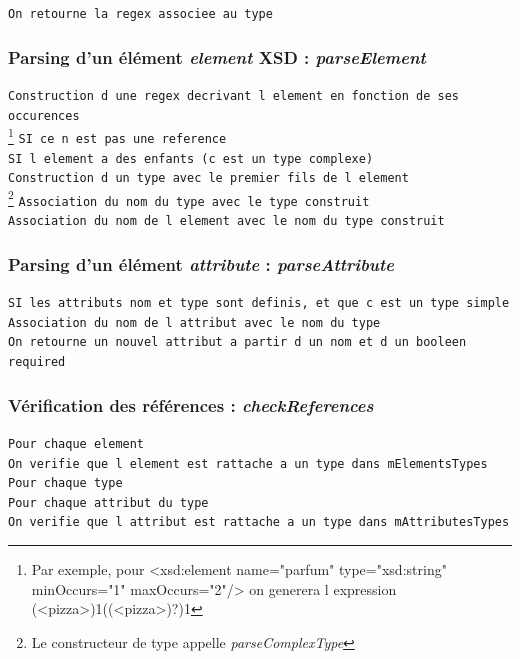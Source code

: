 		\lstinline$On retourne la regex associee au type$\\


	\subsubsection{Parsing d'un élément \textit{element} XSD : \textit{parseElement}}
		\lstinline$Construction d une regex decrivant l element en fonction de ses occurences$\\ \footnote{Par exemple, pour <xsd:element name="parfum" type="xsd:string" minOccurs="1" maxOccurs="2"/> on generera l expression (<pizza>){1}((<pizza>)?){1}}
		\lstinline$SI ce n est pas une reference$\\
		\indent \lstinline$SI l element a des enfants (c est un type complexe)$\\
		\indent \indent \lstinline$Construction d un type avec le premier fils de l element$\\ \footnote{Le constructeur de type appelle \textit{parseComplexType}}
		\indent \lstinline$Association du nom du type avec le type construit$\\
		\indent \lstinline$Association du nom de l element avec le nom du type construit$\\


	\subsubsection{Parsing d'un élément \textit{attribute} : \textit{parseAttribute}}
		\lstinline$SI les attributs nom et type sont definis, et que c est un type simple$\\
		\indent \lstinline$Association du nom de l attribut avec le nom du type$\\
		\lstinline$On retourne un nouvel attribut a partir d un nom et d un booleen required$\\


	\subsubsection{Vérification des références : \textit{checkReferences}}
		\lstinline$Pour chaque element$\\
		\indent \lstinline$On verifie que l element est rattache a un type dans mElementsTypes$\\
		\lstinline$Pour chaque type$\\
		\indent \lstinline$Pour chaque attribut du type$\\
		\indent \indent \lstinline$On verifie que l attribut est rattache a un type dans mAttributesTypes$\\


